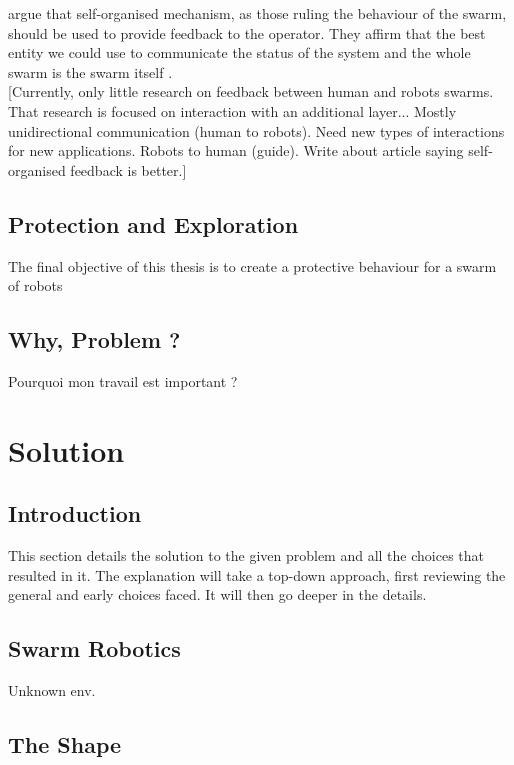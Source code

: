 \documentclass[a4paper, 12pt]{report}
\begin{document}
	\citet{podevijn2012self} argue that self-organised mechanism, as those ruling the behaviour of the swarm, should be used to provide feedback to the operator. They affirm that the best entity we could use to communicate the status of the system and the whole swarm is the swarm itself \citep{podevijn2012self}.\\
	
	
[Currently, only little research on feedback between human and robots swarms. That research is focused on interaction with an additional layer... Mostly unidirectional communication (human to robots). Need new types of interactions for new applications. Robots to human (guide). Write about article saying self-organised feedback is better.]



	\section{Protection and Exploration}
	
	The final objective of this thesis is to create a protective behaviour for a swarm of robots
	\section{Why, Problem ?}
	
	Pourquoi mon travail est important ?

\chapter{Solution}

	\section{Introduction}
	
	This section details the solution to the given problem and all the choices that resulted in it. The explanation will take a top-down approach, first reviewing the general and early choices faced. It will then go deeper in the details.
	
	\section{Swarm Robotics}
	
	Unknown env.
	\section{The Shape}
\end{document}
